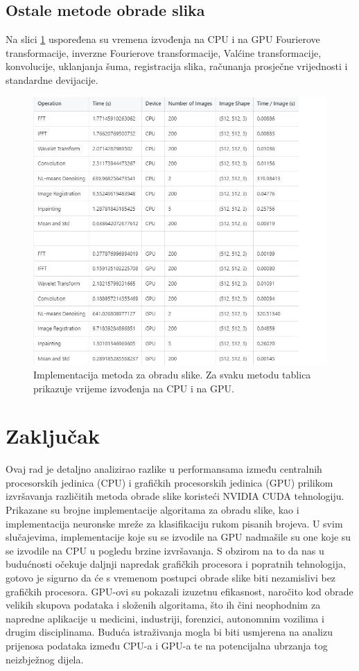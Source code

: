 \documentclass[a4paper,twocolumn]{article}
\begin{document}
        \subsection{Ostale metode obrade slika}
        
        Na slici \ref{fig:ostale_metode} uspoređena su vremena izvođenja na CPU i na GPU Fourierove transformacije, inverzne Fourierove transformacije, Valćine transformacije, konvolucije, uklanjanja šuma, registracija slika, računanja prosječne vrijednosti i standardne devijacije.
        
		\begin{figure}[H]
			\centering
			\includegraphics[width=0.6\linewidth]{slike/ostale_metode_usporedba.jpg} 
			\caption{Implementacija metoda za obradu slike. Za svaku metodu tablica prikazuje vrijeme izvođenja na CPU i na GPU.}
			\label{fig:ostale_metode}
		\end{figure} 
				
	\section{Zaključak}
	Ovaj rad je detaljno analizirao razlike u performansama između centralnih procesorskih jedinica (CPU) i grafičkih procesorskih jedinica (GPU) prilikom izvršavanja različitih metoda obrade slike koristeći NVIDIA CUDA tehnologiju. Prikazane su brojne implementacije algoritama za obradu slike, kao i implementacija neuronske mreže za klasifikaciju rukom pisanih brojeva. U svim slučajevima, implementacije koje su se izvodile na GPU nadmašile su one koje su se izvodile na CPU u pogledu brzine izvršavanja. \newline
	S obzirom na to da nas u budućnosti očekuje daljnji napredak grafičkih procesora i popratnih tehnologija, gotovo je sigurno da će s vremenom postupci obrade slike biti nezamislivi bez grafičkih procesora. GPU-ovi su pokazali izuzetnu efikasnost, naročito kod obrade velikih skupova podataka i složenih algoritama, što ih čini neophodnim za napredne aplikacije u medicini, industriji, forenzici, autonomnim vozilima i drugim disciplinama. \newline
	Buduća istraživanja mogla bi biti usmjerena na analizu prijenosa podataka između CPU-a i GPU-a te na potencijalna ubrzanja tog neizbježnog dijela.
	
	
	

        

 
	
\end{document}
